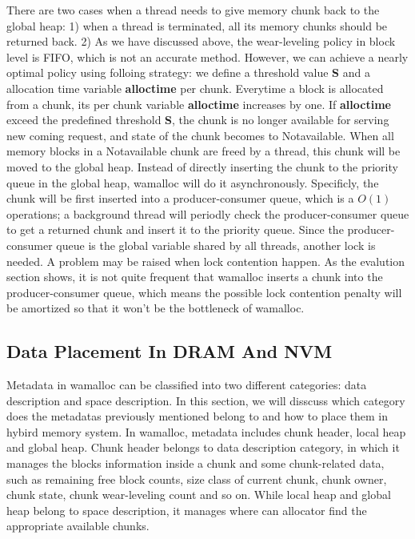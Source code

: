\documentclass{vldb}
\begin{document}
There are two cases when a thread needs to give memory chunk back to the global heap: 
1) when a thread is terminated, all its memory chunks should be returned back.
2) As we have discussed above, the wear-leveling policy in block level is FIFO, which is not an accurate method.
However, we can achieve a nearly optimal policy using folloing strategy: 
we define a threshold value \textbf{S} and a allocation time variable \textbf{alloctime} per chunk. 
Everytime a block is allocated from a chunk, its per chunk variable \textbf{alloctime} increases by one.
If \textbf{alloctime} exceed the predefined threshold \textbf{S}, 
the chunk is no longer available for serving new coming request, and state of the chunk becomes to Notavailable.
When all memory blocks in a Notavailable chunk are freed by a thread, this chunk will be moved to the global heap.
Instead of directly inserting the chunk to the priority queue in the global heap, wamalloc will do it asynchronously.
Specificly, the chunk will be first inserted into a producer-consumer queue, which is a $O(1)$ operations;
a background thread will periodly check the producer-consumer queue to get a returned chunk and insert it to the priority queue.
Since the producer-consumer queue is the global variable shared by all threads, another lock is needed.
A problem may be raised when lock contention happen.
As the evalution section shows, it is not quite frequent that wamalloc inserts a chunk into the producer-consumer queue,
which means the possible lock contention penalty will be amortized so that it won't be the bottleneck of wamalloc.

\subsection{Data Placement In DRAM And NVM}

Metadata in wamalloc can be classified into two different categories: data description and space description.
In this section, we will disscuss which category does the metadatas previously mentioned belong to and how to place them in hybird memory system.
In wamalloc, metadata includes chunk header, local heap and global heap.
Chunk header belongs to data description category, in which it manages the blocks information inside a chunk and some chunk-related data, such as remaining free block counts, size class of current chunk, chunk owner, chunk state, chunk wear-leveling count and so on.
While local heap and global heap belong to space description, it manages where can allocator find the appropriate available chunks.
\end{document}
